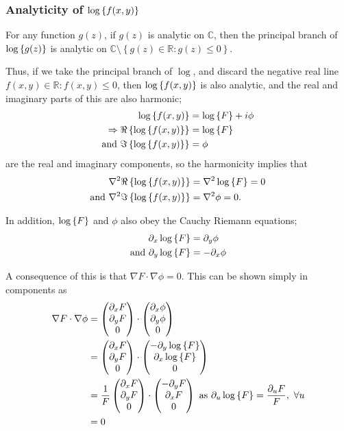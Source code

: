 \subsubsection{Analyticity of $\log \left\{ f(x,y) \right\}$}

For any function $g(z)$, if $g(z)$ is analytic on $\mathbb{C}$, then the
principal branch of $\log \left\{ g(z) \right\}$ is analytic on $\mathbb{C} \setminus \left\{
g(z) \in \mathbb{R} : g(z) \le 0 \right\}$.

Thus, if we take the principal branch of $\log$, and discard the negative real
line $f(x,y) \in \mathbb{R}:f(x,y) \le 0$, then $\log \left\{ f(x,y) \right\}$ is also
analytic, and the real and imaginary parts of this are also harmonic;
\begin{align}
    \log \left\{ f(x,y) \right\} &= \log \left\{ F \right\} + i \phi \\
    \Rightarrow \Re \left\{ \log \left\{ f(x,y) \right\} \right\} &= \log \left\{ F \right\} \\
    \mathrm{and}~ \Im \left\{ \log \left\{ f(x,y) \right\} \right\} &= \phi
\end{align}
are the real and imaginary components, so the harmonicity implies that
\begin{align}
    \nabla^2 \Re \left\{ \log \left\{ f(x,y) \right\} \right\} &= \nabla^2 \log \left\{ F \right\} = 0 \\
    \mathrm{and}~ \nabla^2 \Im \left\{ \log \left\{ f(x,y) \right\} \right\} &= \nabla^2 \phi = 0.
\end{align}

In addition, $\log \left\{ F \right\}$ and $\phi$ also obey the Cauchy Riemann equations;
\begin{align}
    \partial_x \log \left\{ F \right\} &= \partial_y \phi
    \label{eqn:log-cr-1} \\
    \mathrm{and}~ \partial_y \log \left\{ F \right\} &= - \partial_x \phi
    \label{eqn:log-cr-2}
\end{align}

A consequence of this is that $\nabla F \cdot \nabla \phi = 0$. This can be
shown simply in components as
\begin{align}
    \nabla F \cdot \nabla \phi
        &= \begin{pmatrix} \partial_x F \\ \partial_y F \\ 0 \end{pmatrix} \cdot
        \begin{pmatrix} \partial_x \phi \\ \partial_y \phi \\ 0 \end{pmatrix} \\
        &= \begin{pmatrix} \partial_x F \\ \partial_y F \\ 0 \end{pmatrix} \cdot
        \begin{pmatrix} - \partial_y \log \left\{ F \right\} \\ \partial_x \log \left\{ F \right\} \\ 0 \end{pmatrix} \\
        &= \frac{1}{F} \begin{pmatrix} \partial_x F \\ \partial_y F \\ 0 \end{pmatrix} \cdot
        \begin{pmatrix} - \partial_y F \\ \partial_x F \\ 0 \end{pmatrix} ~\mathrm{as}~ \partial_u
        \log \left\{ F \right\} = \frac{\partial_u F}{F}, ~\forall u \\
        &= 0
\end{align}


